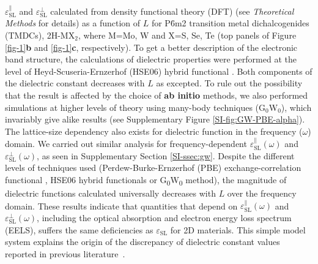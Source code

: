 \documentclass[journal=ancac3,manuscript=article,email=true,hyperref=true,keywords=false]{achemso}
\begin{document}
$\varepsilon^{\parallel}_{\mathrm{SL}}$ and
$\varepsilon^{\perp}_{\mathrm{SL}}$ calculated from density functional
theory (DFT) (see {\it Theoretical Methods} for details) as a function
of $L$ for P\={6}m2 transition metal dichalcogenides (TMDCs),
2H-MX$_{2}$, where M=Mo, W and X=S, Se, Te (top panels of Figure
\ref{fig-1}{\textbf b} and \ref{fig-1}{\textbf c}, respectively). To
get a better description of the electronic band structure, the
calculations of dielectric properties were performed at the level of
Heyd-Scuseria-Ernzerhof (HSE06) hybrid functional
\cite{Heyd_2003,Heyd_2006}.  Both components of the dielectric
constant decreases with $L$ as excepted. To rule out the possibility
that the result is affected by the choice of \textbf{ab initio}
methods, we also performed simulations at higher levels of theory
using many-body techniques (G$_{0}$W$_{0}$), which invariably give
alike results (see Supplementary Figure \ref{SI-fig:GW-PBE-alpha}).
The lattice-size dependency also exists for dielectric function in the
frequency ($\omega$) domain. We carried out similar analysis for
frequency-dependent $\varepsilon^{\parallel}_{\mathrm{SL}}(\omega)$
and $\varepsilon^{\perp}_{\mathrm{SL}}(\omega)$, as seen in
Supplementary Section \ref{SI-ssec:gw}. Despite the different levels
of techniques used (Perdew-Burke-Ernzerhof (PBE) exchange-correlation
functional \cite{Perdew_1996,Ernzerhof_1999,Paier_2005}, HSE06 hybrid
functionals or G\textsubscript{0}W\textsubscript{0} method), the
magnitude of dielectric functions calculated universally decreases
with $L$ over the frequency domain.  These results indicate that
quantities that depend on
$\varepsilon^{\parallel}_{\mathrm{SL}}(\omega)$ and
$\varepsilon^{\perp}_{\mathrm{SL}}(\omega)$, including the optical
absorption and electron energy loss spectrum (EELS), suffers the same
deficiencies as $\varepsilon_{\mathrm{SL}}$ for 2D materials. This
simple model system explains the origin of the discrepancy of dielectric constant values reported in previous literature~\cite{Li_2016}.
%
%
%
%
%
\end{document}
